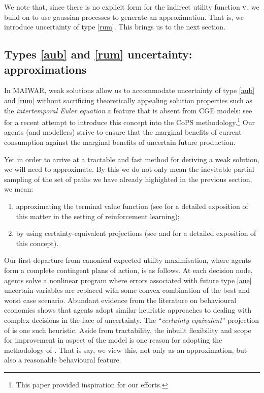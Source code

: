 \documentclass[12pt,a4paper,twoside, draft]{article}
\begin{document}
We note that, since there is no explicit form for the indirect utility function
$\textup{v}$, we build on \citet{Scheidegger_Bilionis-Gaussian_processes} to
use gaussian processes to generate an approximation.
That is, we introduce uncertainty of type \ref{rum}.
This brings us to the next section.
\subsection{Types \ref{aub} and \ref{rum} uncertainty: approximations}
\label{sec-approximation}
In MAIWAR, weak solutions allow us to accommodate uncertainty of type \ref{aub}
and \ref{rum} without sacrificing theoretically appealing
solution properties such as the \emph{intertemporal Euler equation} a feature
that is absent from CGE models: see \cite{Dixon_Rimmer-Euler_CGE} for a recent
attempt to introduce this concept into the CoPS methodology.\footnote{
   This paper provided inspiration for our efforts.
}
Our agents (and modellers) strive to ensure that the marginal benefits of
current consumption against the marginal benefits of uncertain future
production.

Yet in order to arrive at a tractable and fast method for deriving a weak
solution, we will need to approximate.
By this we do not only mean the inevitable partial sampling of the set of
paths we have already highighted in the previous section, we mean:
\begin{enumerate}
\item approximating the terminal value function (see 
\citet{Bertsekas-Reinforcement_learning} for a detailed exposition of this
matter in the setting of reinforcement learning);
\item  by using certainty-equivalent projections (see \citet{CJ} and
   \citet{CJS-Certainty_equivalent} for a detailed exposition of this concept).
\end{enumerate}

Our first departure from canonical expected utility maximisation, where agents
form a complete contingent plans of action, is as follows.
At each decision node, agents solve a nonlinear program where errors
associated with future type \ref{aue} uncertain variables are replaced with
some convex combination of the best and worst case scenario.
Abundant evidence from the literature on behavioural economics shows
that agents adopt similar heuristic approaches to dealing with complex
decisions in the face of uncertainty.
The ``\emph{certainty equivalent}'' projection of \cite{CJ} is one such
heuristic. 
Aside from tractability, the inbuilt flexibility and scope for improvement in
aspect of the model is one reason for adopting the methodology of \cite{CJ}.
That is say, we view this, not only as an approximation, but also a reasonable
behavioural feature.
\end{document}
